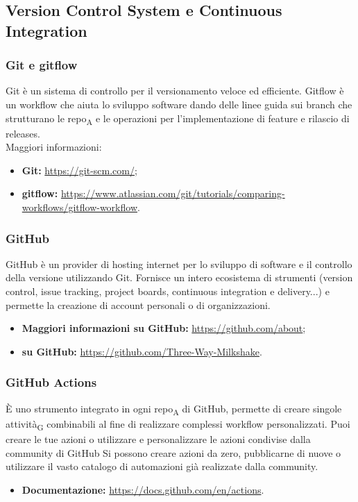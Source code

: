 \subsection{Version Control System e Continuous Integration}

\subsubsection{Git e gitflow}
Git è un sistema di controllo per il versionamento veloce ed efficiente. Gitflow è un workflow che aiuta lo sviluppo software dando delle linee guida sui branch che strutturano le repo\textsubscript{A} e le operazioni per l'implementazione di feature e rilascio di releases.\\
Maggiori informazioni:
\begin{itemize}
    \item \textbf{Git: }\url{https://git-scm.com/};
    \item \textbf{gitflow: }\url{https://www.atlassian.com/git/tutorials/comparing-workflows/gitflow-workflow}.
\end{itemize}

\subsubsection{GitHub}
GitHub è un provider di hosting internet per lo sviluppo di software e il controllo della versione utilizzando Git. Fornisce un intero ecosistema di strumenti (version control, issue tracking, project boards, continuous integration e delivery...) e permette la creazione di account personali o di organizzazioni.
\begin{itemize}
    \item \textbf{Maggiori informazioni su GitHub:} \url{https://github.com/about};
    \item \textbf{\group{} su GitHub: }\url{https://github.com/Three-Way-Milkshake}.
\end{itemize}

\subsubsection{GitHub Actions}
È uno strumento integrato in ogni repo\textsubscript{A} di GitHub, permette di creare singole attività\textsubscript{G} combinabili al fine di realizzare complessi workflow personalizzati. Puoi creare le tue azioni o utilizzare e personalizzare le azioni condivise dalla community di GitHub
Si possono creare azioni da zero, pubblicarne di nuove o utilizzare il vasto catalogo di automazioni già realizzate dalla community.
\begin{itemize}
    \item \textbf{Documentazione: } \url{https://docs.github.com/en/actions}.
\end{itemize}